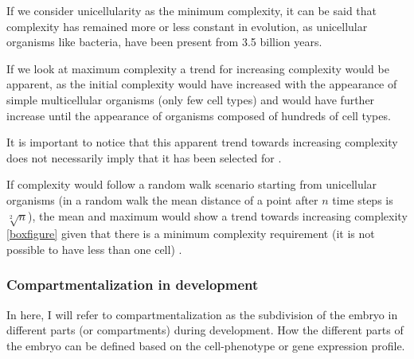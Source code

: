 \begin{mdframed}[style=boxstyle,frametitle={Box1. On the relationship between the increase of complexity in Evolution and Development}]
If we consider unicellularity as the minimum complexity, it can be said that complexity has remained more or less constant in evolution, as unicellular organisms like bacteria, have been present from 3.5 billion years.

If we look at maximum complexity a trend for increasing complexity would be apparent, as the initial complexity would have increased with the appearance of simple multicellular organisms (only few cell types) and would have further increase until the appearance of organisms composed of hundreds of cell types.

It is important to notice that this apparent trend towards increasing complexity does not necessarily imply that it has been selected for \citep{McShea2015}.

If complexity would follow a random walk scenario starting from unicellular organisms (in a random walk the mean distance of a point after $n$ time steps is $\sqrt[2]{n}$), the mean and maximum would show a trend towards increasing complexity \ref{boxfigure} given that there is a minimum complexity requirement (it is not possible to have less than one cell) \citep{gould1996fullhouse}.

\end{mdframed}

\subsubsection{Compartmentalization in development}

In here, I will refer to compartmentalization as the subdivision of the embryo in different parts (or compartments) during development. 
How the different parts of the embryo can be defined based on the cell-phenotype or gene expression profile.

